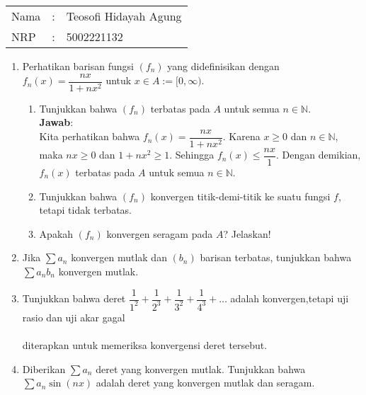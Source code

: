 \documentclass{article}
\newcommand{\jawab}{\textbf{Jawab}:}
\newcommand{\N}{\mathbb{N}}
\begin{document}
    \begin{tabular}{|lcl|}
     \hline
     Nama&:&Teosofi Hidayah Agung\\
     NRP&:&5002221132\\
     \hline
    \end{tabular}
    \begin{enumerate}
        \item Perhatikan barisan fungsi $(f_n)$ yang didefinisikan dengan $f_n(x)=\dfrac{nx}{1+nx^2}$ untuk $x\in A:=[0,\infty)$.
        \begin{enumerate}
            \item Tunjukkan bahwa $(f_n)$ terbatas pada $A$ untuk semua $n\in\N$.\\
            \jawab\\
            Kita perhatikan bahwa $f_n(x)=\dfrac{nx}{1+nx^2}$. Karena $x\geq 0$ dan $n\in\N$, maka $nx\geq 0$ dan $1+nx^2\geq 1$. Sehingga $f_n(x)\leq \dfrac{nx}{1}$. Dengan demikian, $f_n(x)$ terbatas pada $A$ untuk semua $n\in\N$.
            \item Tunjukkan bahwa $(f_n)$ konvergen titik-demi-titik ke suatu fungsi $f$, tetapi tidak terbatas.
            \item Apakah $(f_n)$ konvergen seragam pada $A$? Jelaskan!
        \end{enumerate}
        \item Jika $\sum a_n$ konvergen mutlak dan $(b_n)$ barisan terbatas, tunjukkan bahwa $\sum a_nb_n$ konvergen mutlak.
        \item Tunjukkan bahwa deret $\dfrac{1}{1^2}+\dfrac{1}{2^3}+\dfrac{1}{3^2}+\dfrac{1}{4^3}+\dots$ adalah konvergen,tetapi uji rasio dan uji akar gagal \\~\\
        diterapkan untuk memeriksa konvergensi deret tersebut.
        \item Diberikan $\sum a_n$ deret yang konvergen mutlak. Tunjukkan bahwa $\sum a_n \sin(nx)$ adalah deret yang konvergen mutlak dan seragam.
    \end{enumerate}
\end{document}
